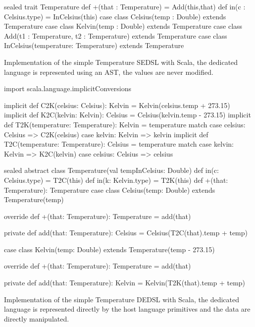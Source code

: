 \begin{listing}[ht]
\centering
\begin{scalacode}
sealed trait Temperature {
  def +(that : Temperature) = Add(this,that)
  def in(c : Celsius.type) = InCelsius(this)
}
case class Celsius(temp : Double) extends Temperature
case class Kelvin(temp : Double) extends Temperature
case class Add(t1 : Temperature, t2 : Temperature) extends Temperature
case class InCelsius(temperature: Temperature) extends Temperature
\end{scalacode}
\caption[Implementation of a \gls{SEDSL} for Temperature in
Scala]{Implementation of the simple Temperature \gls{SEDSL} with Scala, the
dedicated language is represented using an \gls{AST}, the values are never modified.}
\label{lst:shallow_temp_scala}
\end{listing}

\begin{listing}[ht]
\centering
\begin{scalacode}
import scala.language.implicitConversions

implicit def C2K(celsius: Celsius): Kelvin = Kelvin(celsius.temp + 273.15)
implicit def K2C(kelvin: Kelvin): Celsius = Celsius(kelvin.temp - 273.15)
implicit def T2K(temperature: Temperature): Kelvin = temperature match {
  case celsius: Celsius => C2K(celsius)
  case kelvin: Kelvin => kelvin
}
implicit def T2C(temperature: Temperature): Celsius = temperature match {
  case kelvin: Kelvin => K2C(kelvin)
  case celsius: Celsius => celsius
}

sealed abstract class Temperature(val tempInCelsius: Double) {
  def in(c: Celsius.type) = T2C(this)
  def in(k: Kelvin.type) = T2K(this)
  def +(that: Temperature): Temperature
}
case class Celsius(temp: Double) extends Temperature(temp) {
  override def +(that: Temperature): Temperature = add(that)

  private def add(that: Temperature): Celsius = {
    Celsius(T2C(that).temp + temp)
  }
}
case class Kelvin(temp: Double) extends Temperature(temp - 273.15) {
  override def +(that: Temperature): Temperature = add(that)

  private def add(that: Temperature): Kelvin = {
    Kelvin(T2K(that).temp + temp)
  }
}
\end{scalacode}
\caption[Implementation of a \gls{DEDSL} for Temperature in
Scala]{Implementation of the simple Temperature \gls{DEDSL} with Scala, the
dedicated language is represented directly by the host language primitives and
the data are directly manipulated.}
\label{lst:deep_temp_scala}
\end{listing}

